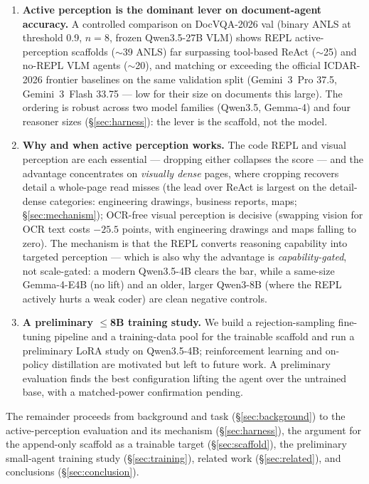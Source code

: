 \begin{enumerate}
\item \textbf{Active perception is the dominant lever on document-agent accuracy.} A controlled comparison on DocVQA-2026 val (binary ANLS at threshold 0.9, $n{=}8$, frozen Qwen3.5-27B VLM) shows REPL active-perception scaffolds ($\sim$39 ANLS) far surpassing tool-based ReAct ($\sim$25) and no-REPL VLM agents ($\sim$20), and matching or exceeding the official ICDAR-2026 frontier baselines on the same validation split (Gemini~3~Pro 37.5, Gemini~3~Flash 33.75 --- low for their size on documents this large). The ordering is robust across two model families (Qwen3.5, Gemma-4) and four reasoner sizes (\S\ref{sec:harness}): the lever is the scaffold, not the model.

\item \textbf{Why and when active perception works.} The code REPL and visual perception are each essential --- dropping either collapses the score --- and the advantage concentrates on \emph{visually dense} pages, where cropping recovers detail a whole-page read misses (the lead over ReAct is largest on the detail-dense categories: engineering drawings, business reports, maps; \S\ref{sec:mechanism}); OCR-free visual perception is decisive (swapping vision for OCR text costs $-25.5$ points, with engineering drawings and maps falling to zero). The mechanism is that the REPL converts reasoning capability into targeted perception --- which is also why the advantage is \emph{capability-gated}, not scale-gated: a modern Qwen3.5-4B clears the bar, while a same-size Gemma-4-E4B (no lift) and an older, larger Qwen3-8B (where the REPL actively hurts a weak coder) are clean negative controls.

\item \textbf{A preliminary $\leq$8B training study.} We build a rejection-sampling fine-tuning pipeline and a training-data pool for the trainable scaffold and run a preliminary LoRA study on Qwen3.5-4B; reinforcement learning and on-policy distillation are motivated but left to future work. A preliminary evaluation finds the best configuration lifting the agent over the untrained base, with a matched-power confirmation pending.
\end{enumerate}

The remainder proceeds from background and task (\S\ref{sec:background}) to the active-perception evaluation and its mechanism (\S\ref{sec:harness}), the argument for the append-only scaffold as a trainable target (\S\ref{sec:scaffold}), the preliminary small-agent training study (\S\ref{sec:training}), related work (\S\ref{sec:related}), and conclusions (\S\ref{sec:conclusion}).
